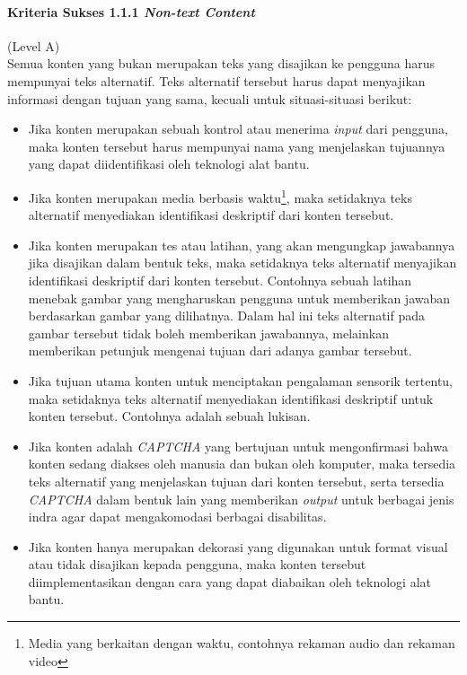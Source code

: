 \paragraph{Kriteria Sukses 1.1.1 \textit{Non-text Content}}
\label{sec:kriteria_sukses_1.1.1}
(Level A)\\

Semua konten yang bukan merupakan teks yang disajikan ke pengguna harus mempunyai teks alternatif. Teks alternatif tersebut harus dapat menyajikan informasi dengan tujuan yang sama, kecuali untuk situasi-situasi berikut:
\begin{itemize}
	\item Jika konten merupakan sebuah kontrol atau menerima \textit{input} dari pengguna, maka konten tersebut harus mempunyai nama yang menjelaskan tujuannya yang dapat diidentifikasi oleh teknologi alat bantu.
	\item Jika konten merupakan media berbasis waktu\footnote{Media yang berkaitan dengan waktu, contohnya rekaman audio dan rekaman video}, maka setidaknya teks alternatif menyediakan identifikasi deskriptif dari konten tersebut.
	\item Jika konten merupakan tes atau latihan, yang akan mengungkap jawabannya jika disajikan dalam bentuk teks, maka setidaknya teks alternatif menyajikan identifikasi deskriptif dari konten tersebut. Contohnya sebuah latihan menebak gambar yang mengharuskan pengguna untuk memberikan jawaban berdasarkan gambar yang dilihatnya. Dalam hal ini teks alternatif pada gambar tersebut tidak boleh memberikan jawabannya, melainkan memberikan petunjuk mengenai tujuan dari adanya gambar tersebut.
	\item Jika tujuan utama konten untuk menciptakan pengalaman sensorik tertentu, maka setidaknya teks alternatif menyediakan identifikasi deskriptif untuk konten tersebut. Contohnya adalah sebuah lukisan.
	\item Jika konten adalah \textit{CAPTCHA} yang bertujuan untuk mengonfirmasi bahwa konten sedang diakses oleh manusia dan bukan oleh komputer, maka tersedia teks alternatif yang menjelaskan tujuan dari konten tersebut, serta tersedia \textit{CAPTCHA} dalam bentuk lain yang memberikan \textit{output} untuk berbagai jenis indra agar dapat mengakomodasi berbagai disabilitas.
	\item Jika konten hanya merupakan dekorasi yang digunakan untuk format visual atau tidak disajikan kepada pengguna, maka konten tersebut diimplementasikan dengan cara yang dapat diabaikan oleh teknologi alat bantu.
\end{itemize}

